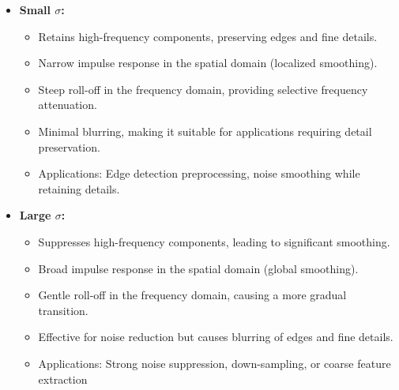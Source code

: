 \documentclass[11pt, conference, letterpaper]{IEEEtran}
\begin{document}
\begin{itemize}
    \item \textbf{Small \(\sigma\):}
    \begin{itemize}
        \item Retains high-frequency components, preserving edges and fine details.
        \item Narrow impulse response in the spatial domain (localized smoothing).
        \item Steep roll-off in the frequency domain, providing selective frequency attenuation.
        \item Minimal blurring, making it suitable for applications requiring detail preservation.
        \item Applications: Edge detection preprocessing, noise smoothing while retaining details.
    \end{itemize}
    \item \textbf{Large \(\sigma\):}
    \begin{itemize}
        \item Suppresses high-frequency components, leading to significant smoothing.
        \item Broad impulse response in the spatial domain (global smoothing).
        \item Gentle roll-off in the frequency domain, causing a more gradual transition.
        \item Effective for noise reduction but causes blurring of edges and fine details.
        \item Applications: Strong noise suppression, down-sampling, or coarse feature extraction
    \end{itemize}
\end{itemize}

\end{document}
